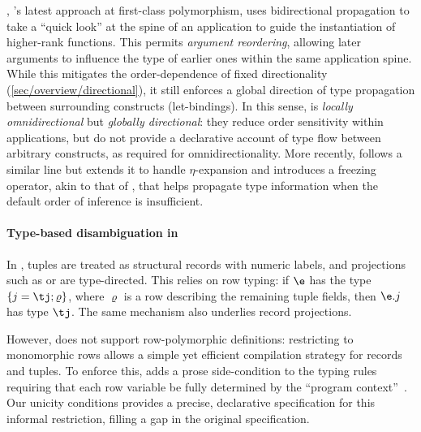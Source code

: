 \documentclass[acmsmall,screen,nonacm%
\Anonymous{,anonymous}{}%
\Final{}{,review}%
]{acmart}
\begin{document}
\QuickLook \citep{journals/pacmpl/SerranoHJV20}, \Haskell's latest approach at
first-class polymorphism, uses bidirectional propagation to take a ``quick
look'' at the spine of an application to guide the instantiation of higher-rank
functions. This permits \emph{argument reordering}, allowing later arguments to
influence the type of earlier ones within the same application spine. While
this mitigates the order-dependence of fixed directionality
(\cref{sec/overview/directional}), it still enforces a global direction of type
propagation between surrounding constructs (\eg let-bindings). In this sense,
\QuickLook is \emph{locally omnidirectional} but \emph{globally directional}:
they reduce order sensitivity within applications, but do not provide a
declarative account of type flow between arbitrary constructs, as required for
omnidirectionality. More recently, \Frost \citep{journals/corr/abs-2607-16061}
follows a similar line but extends it to handle $\eta$-expansion and introduces
a freezing operator, akin to that of \FreezeML, that helps propagate type
information when the default order of inference is insufficient.

\paragraph{Type-based disambiguation in \SML}

In \SML, tuples are treated as structural records with numeric labels, and
projections such as  or  are type-directed. This relies on
row typing: if $\e$ has the type $\tsrecord {j = \tj; \varrho}$, where
$\varrho$ is a row describing the remaining tuple fields, then $\eproj \e j$
has type $\tj$. The same mechanism also underlies record projections.

However, \SML does not support row-polymorphic definitions: restricting to
monomorphic rows allows a simple yet efficient compilation strategy for records
and tuples. To enforce this, \SML adds a prose side-condition to the typing
rules requiring that each row variable be fully determined by the ``program
context''~\citep*[Section 4.11]{sml-definition}. Our unicity conditions
provides a precise, declarative specification for this informal restriction,
filling a gap in the original specification.
\end{document}
